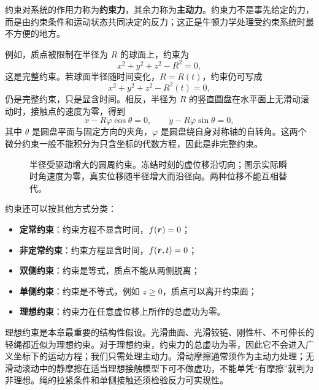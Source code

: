 约束对系统的作用力称为\textbf{约束力}，其余力称为\textbf{主动力}。约束力不是事先给定的力，而是由约束条件和运动状态共同决定的反力；这正是牛顿力学处理受约束系统时最不方便的地方。

例如，质点被限制在半径为 $R$ 的球面上，约束为
\[
x^2+y^2+z^2-R^2=0,
\]
这是完整约束。若球面半径随时间变化，$R=R(t)$，约束仍可写成
\[
x^2+y^2+z^2-R^2(t)=0,
\]
仍是完整约束，只是显含时间。相反，半径为 $R$ 的竖直圆盘在水平面上无滑动滚动时，接触点的速度为零，得到
\[
\dot x-R\dot\varphi\cos\theta=0,\qquad
\dot y-R\dot\varphi\sin\theta=0,
\]
其中 $\theta$ 是圆盘平面与固定方向的夹角，$\varphi$ 是圆盘绕自身对称轴的自转角。这两个微分约束一般不能积分为只含坐标的代数方程，因此是非完整约束。

\begin{figure}[htbp]
\centering
{}
\caption{半径受驱动增大的圆周约束。冻结时刻的虚位移沿切向；图示实际瞬时角速度为零，真实位移随半径增大而沿径向。两种位移不能互相替代。}
\label{fig:virtual-displacement}
\end{figure}

约束还可以按其他方式分类：
\begin{itemize}[leftmargin=1.8em]
  \item \textbf{定常约束}：约束方程不显含时间，$f(\boldsymbol{r})=0$；
  \item \textbf{非定常约束}：约束方程显含时间，$f(\boldsymbol{r},t)=0$；
  \item \textbf{双侧约束}：约束是等式，质点不能从两侧脱离；
  \item \textbf{单侧约束}：约束是不等式，例如 $z\ge 0$，质点可以离开约束面；
  \item \textbf{理想约束}：约束力在任意虚位移上所作的总虚功为零。
\end{itemize}

理想约束是本章最重要的结构性假设。光滑曲面、光滑铰链、刚性杆、不可伸长的轻绳都近似为理想约束。对于理想约束，约束力的总虚功为零，因此它不会进入广义坐标下的运动方程；我们只需处理主动力。滑动摩擦通常须作为主动力处理；无滑动滚动中的静摩擦在适当理想接触模型下可不做虚功，不能单凭“有摩擦”就判为非理想。绳的拉紧条件和单侧接触还须检验反力可实现性。

